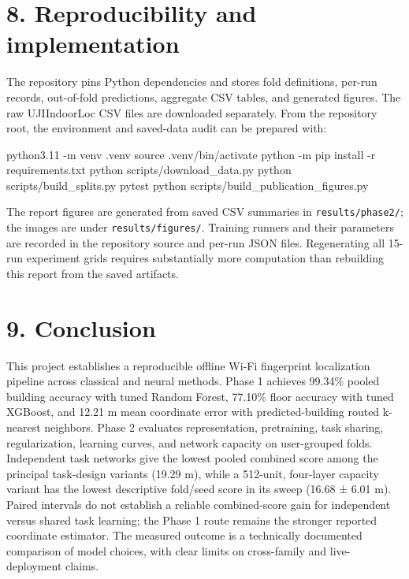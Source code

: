 \documentclass[
  10pt,
  a4paper,
]{article}
\newenvironment{Shaded}{}{}
\newcommand{\AttributeTok}[1]{\textcolor[rgb]{0.49,0.56,0.16}{#1}}
\newcommand{\BuiltInTok}[1]{\textcolor[rgb]{0.00,0.50,0.00}{#1}}
\newcommand{\ExtensionTok}[1]{#1}
\newcommand{\NormalTok}[1]{#1}
\begin{document}
\section{8. Reproducibility and
implementation}\label{reproducibility-and-implementation}

The repository pins Python dependencies and stores fold definitions,
per-run records, out-of-fold predictions, aggregate CSV tables, and
generated figures. The raw UJIIndoorLoc CSV files are downloaded
separately. From the repository root, the environment and saved-data
audit can be prepared with:

\begin{Shaded}
\begin{Highlighting}[]
\ExtensionTok{python3.11} \AttributeTok{{-}m}\NormalTok{ venv .venv}
\BuiltInTok{source}\NormalTok{ .venv/bin/activate}
\ExtensionTok{python} \AttributeTok{{-}m}\NormalTok{ pip install }\AttributeTok{{-}r}\NormalTok{ requirements.txt}
\ExtensionTok{python}\NormalTok{ scripts/download\_data.py}
\ExtensionTok{python}\NormalTok{ scripts/build\_splits.py}
\ExtensionTok{pytest}
\ExtensionTok{python}\NormalTok{ scripts/build\_publication\_figures.py}
\end{Highlighting}
\end{Shaded}

The report figures are generated from saved CSV summaries in
\texttt{results/phase2/}; the images are under
\texttt{results/figures/}. Training runners and their parameters are
recorded in the repository source and per-run JSON files. Regenerating
all 15-run experiment grids requires substantially more computation than
rebuilding this report from the saved artifacts.

\section{9. Conclusion}\label{conclusion}

This project establishes a reproducible offline Wi-Fi fingerprint
localization pipeline across classical and neural methods. Phase 1
achieves 99.34\% pooled building accuracy with tuned Random Forest,
77.10\% floor accuracy with tuned XGBoost, and 12.21 m mean coordinate
error with predicted-building routed k-nearest neighbors. Phase 2
evaluates representation, pretraining, task sharing, regularization,
learning curves, and network capacity on user-grouped folds. Independent
task networks give the lowest pooled combined score among the principal
task-design variants (19.29 m), while a 512-unit, four-layer capacity
variant has the lowest descriptive fold/seed score in its sweep (16.68 ±
6.01 m). Paired intervals do not establish a reliable combined-score
gain for independent versus shared task learning; the Phase 1 route
remains the stronger reported coordinate estimator. The measured outcome
is a technically documented comparison of model choices, with clear
limits on cross-family and live-deployment claims.
\end{document}
